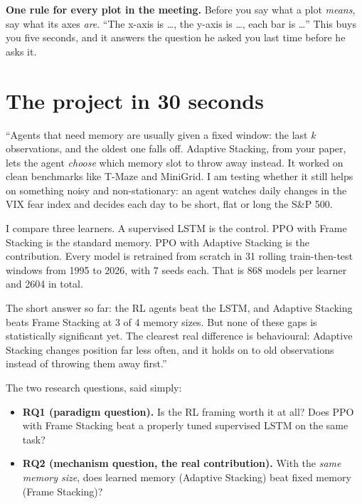 \documentclass[11pt,a4paper]{article}
\begin{document}
\textbf{One rule for every plot in the meeting.} Before you say what a plot \emph{means},
say what its axes \emph{are}. ``The x-axis is \ldots, the y-axis is \ldots, each bar is \ldots''
This buys you five seconds, and it answers the question he asked you last time before he
asks it.

\section{The project in 30 seconds}

\begin{sayit}
``Agents that need memory are usually given a fixed window: the last $k$ observations, and
the oldest one falls off. Adaptive Stacking, from your paper, lets the agent \emph{choose}
which memory slot to throw away instead. It worked on clean benchmarks like T-Maze and
MiniGrid. I am testing whether it still helps on something noisy and non-stationary: an
agent watches daily changes in the VIX fear index and decides each day to be short, flat
or long the S\&P 500.

I compare three learners. A supervised LSTM is the control. PPO with Frame Stacking is the
standard memory. PPO with Adaptive Stacking is the contribution. Every model is retrained
from scratch in 31 rolling train-then-test windows from 1995 to 2026, with 7 seeds each.
That is 868 models per learner and 2604 in total.

The short answer so far: the RL agents beat the LSTM, and Adaptive Stacking beats Frame
Stacking at 3 of 4 memory sizes. But none of these gaps is statistically significant
yet. The clearest real difference is behavioural: Adaptive Stacking changes position far
less often, and it holds on to old observations instead of throwing them away first.''
\end{sayit}

The two research questions, said simply:
\begin{itemize}
  \item \textbf{RQ1 (paradigm question).} Is the RL framing worth it at all? Does PPO with
        Frame Stacking beat a properly tuned supervised LSTM on the same task?
  \item \textbf{RQ2 (mechanism question, the real contribution).} With the \emph{same memory
        size}, does learned memory (Adaptive Stacking) beat fixed memory (Frame Stacking)?
\end{itemize}
\end{document}

